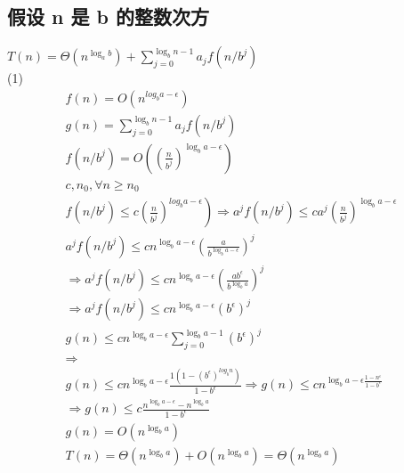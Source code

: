 \subsection{假设 n 是 b 的整数次方}
$T(n)=\Theta\left(n^{\log _{a} b}\right)+\sum_{j=0}^{\log _{b} n-1} a_{j} f\left(n / b^{j}\right)$\\
(1)
 $$
 \begin{array}{l}
f(n)=O\left(n^{l o g_{b} a-\epsilon}\right) \\
g(n)=\sum_{j=0}^{\log _{b} n-1} a_{j} f\left(n / b^{j}\right) \\
f\left(n / b^{j}\right)=O\left(\left(\frac{n}{b^{j}}\right)^{\log _{b} a-\epsilon}\right) \\
c, n_{0}, \forall n \geq n_{0} \\
\left.f\left(n / b^{j}\right) \leq c\left(\frac{n}{b^{j}}\right)^{l o g_{b} a-\epsilon}\right) \Rightarrow a^{j} f\left(n / b^{j}\right) \leq c a^{j}\left(\frac{n}{b^{j}}\right)^{\log _{b} a-\epsilon} \\
a^{j} f\left(n / b^{j}\right) \leq c n^{\log _{b} a-\epsilon}\left(\frac{a}{b^{\log _{b} a-\epsilon}}\right)^{j} \\
\Rightarrow a^{j} f\left(n / b^{j}\right) \leq c n^{\log _{b} a-\epsilon}\left(\frac{a b^{\epsilon}}{b^{\log _{b} a}}\right)^{j} \\
\Rightarrow a^{j} f\left(n / b^{j}\right) \leq c n^{\log _{b} a-\epsilon}\left(b^{\epsilon}\right)^{j} \\
g(n) \leq c n^{\log _{b} a-\epsilon} \sum_{j=0}^{\log _{b} a-1}\left(b^{\epsilon}\right)^{j} \\
\Rightarrow \\g(n) \leq c n^{\log _{b} a-\epsilon} \frac{1\left(1-\left(b^{\epsilon}\right)^{l o g_{b} n}\right)}{1-b^{\epsilon}}
\Rightarrow g(n) \leq c n^{\log _{b} a-\epsilon \frac{1-n^{\epsilon}}{1-b^{\epsilon}}} \\
\Rightarrow g(n) \leq c \frac{n^{\log _{b} a-\epsilon}-n^{\log _{b} a}}{1-b^{\epsilon}} \\
g(n)=O\left(n^{\log _{b} a}\right) \\
T(n)=\Theta\left(n^{\log _{b} a}\right)+O\left(n^{\log _{b} a}\right)=\Theta\left(n^{\log _{b} a}\right)
\end{array}
 $$
